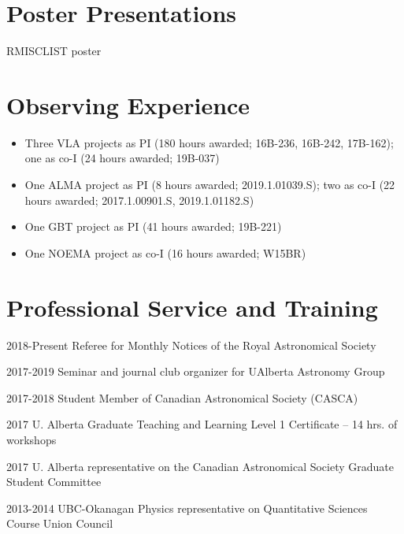 \documentclass[letterpaper,11pt]{article}
\newlength{\mainindent} \setlength{\mainindent}{12pt}
\newlength{\contentindent} \setlength{\contentindent}{19ex}
\newenvironment{datelist}{
  \begingroup
  \raggedright
  \begin{description}[labelindent=\mainindent,leftmargin=\contentindent,
      style=sameline,font=\normalfont,topsep=0pt,partopsep=0pt,parsep=0pt,
      itemsep=4pt]
}{
  \end{description}
  \endgroup
}
\begin{document}
\section*{Poster Presentations}
\begin{datelist}
RMISCLIST poster
\end{datelist}



\section*{Observing Experience}
\begin{itemize}
\item Three VLA projects as PI (180 hours awarded; 16B-236, 16B-242, 17B-162); one as co-I (24 hours awarded; 19B-037)
\item One ALMA project as PI (8 hours awarded; 2019.1.01039.S); two as co-I (22 hours awarded; 2017.1.00901.S, 2019.1.01182.S)
\item One GBT project as PI (41 hours awarded; 19B-221)
\item One NOEMA project as co-I (16 hours awarded; W15BR)
\end{itemize}

\section*{Professional Service and Training}
\begin{datelist}

\item[2018-Present] Referee for Monthly Notices of the Royal Astronomical Society
\item[2017-2019] Seminar and journal club organizer for UAlberta Astronomy Group
\item[2017-2018] Student Member of Canadian Astronomical Society (CASCA)
\item[2017] U. Alberta Graduate Teaching and Learning Level 1 Certificate -- 14 hrs. of workshops
\item[2017] U. Alberta representative on the Canadian Astronomical Society Graduate Student Committee
\item[2013-2014] UBC-Okanagan Physics representative on Quantitative Sciences Course Union Council

\end{datelist}
\end{document}
